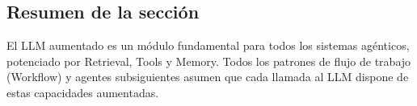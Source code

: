 \subsection{Resumen de la sección}
El LLM aumentado es un módulo fundamental para todos los sistemas agénticos, potenciado por Retrieval, Tools y Memory. Todos los patrones de flujo de trabajo (Workflow) y agentes subsiguientes asumen que cada llamada al LLM dispone de estas capacidades aumentadas.

